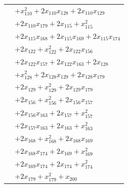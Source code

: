 \begin{longtable}{@{}r@{\;}l@{}}
 & \(\displaystyle +x_{110}^{2} +2x_{110}x_{128} +2x_{110}x_{129}\) \\
 & \(\displaystyle +2x_{110}x_{179} +2x_{115} +x_{115}^{2}\) \\
 & \(\displaystyle +2x_{115}x_{168} +2x_{115}x_{169} +2x_{115}x_{174}\) \\
 & \(\displaystyle +2x_{122} +x_{122}^{2} +2x_{122}x_{156}\) \\
 & \(\displaystyle +2x_{122}x_{157} +2x_{122}x_{163} +2x_{128}\) \\
 & \(\displaystyle +x_{128}^{2} +2x_{128}x_{129} +2x_{128}x_{179}\) \\
 & \(\displaystyle +2x_{129} +x_{129}^{2} +2x_{129}x_{179}\) \\
 & \(\displaystyle +2x_{156} +x_{156}^{2} +2x_{156}x_{157}\) \\
 & \(\displaystyle +2x_{156}x_{163} +2x_{157} +x_{157}^{2}\) \\
 & \(\displaystyle +2x_{157}x_{163} +2x_{163} +x_{163}^{2}\) \\
 & \(\displaystyle +2x_{168} +x_{168}^{2} +2x_{168}x_{169}\) \\
 & \(\displaystyle +2x_{168}x_{174} +2x_{169} +x_{169}^{2}\) \\
 & \(\displaystyle +2x_{169}x_{174} +2x_{174} +x_{174}^{2}\) \\
 & \(\displaystyle +2x_{179} +x_{179}^{2} +x_{200}\) \\[3pt]
\end{longtable}
\endgroup
